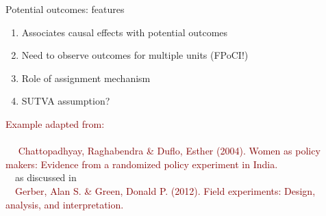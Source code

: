 \documentclass[xcolor={dvipsnames},handout]{beamer}
\begin{document}
\begin{frame}{Potential outcomes: features}


\begin{enumerate}
\item Associates causal effects with potential outcomes
\item Need to observe outcomes for multiple units (FPoCI!)
\item Role of assignment mechanism
\item[(4.)] SUTVA assumption?
\end{enumerate}


\end{frame}



\begin{frame}[c]{}
\textcolor{Maroon}{Example adapted from:}
\\~\
\\~\
\centering
\textcolor{Maroon}{Chattopadhyay, Raghabendra \& Duflo, Esther (2004). Women as policy makers: Evidence from a randomized policy experiment in India.}
\\~\
as discussed in
\\~\
\textcolor{Maroon}{Gerber, Alan S. \& Green, Donald P. (2012). Field experiments: Design, analysis, and interpretation.}
\nocite{chattopadhyay2004women, gerber2012field, butler2011politicians}


\end{frame}


\end{document}
